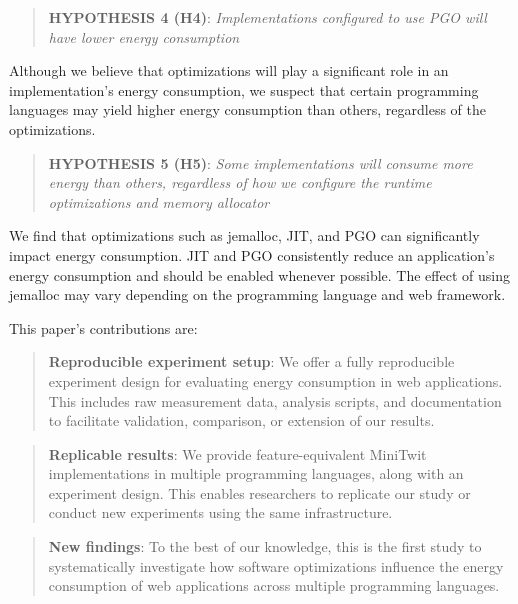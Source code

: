 \documentclass[../main.tex]{subfiles}
\begin{document}
\begin{quote}
    \textbf{HYPOTHESIS 4 (H4)}: \emph{Implementations configured to use PGO will have lower energy consumption}
\end{quote}

Although we believe that optimizations will play a significant role in an implementation's energy consumption, we suspect that certain programming languages may yield higher energy consumption than others, regardless of the optimizations. 

\begin{quote}
    \textbf{HYPOTHESIS 5 (H5)}: \emph{Some implementations will consume more energy than others, regardless of how we configure the runtime optimizations and memory allocator}
\end{quote}

We find that optimizations such as jemalloc, JIT, and PGO can significantly impact energy consumption. JIT and PGO consistently reduce an application's energy consumption and should be enabled whenever possible. The effect of using jemalloc may vary depending on the programming language and web framework.

This paper's contributions are:

\begin{quote}
    \textbf{Reproducible experiment setup}: We offer a fully reproducible experiment design for evaluating energy consumption in web applications. This includes raw measurement data, analysis scripts, and documentation to facilitate validation, comparison, or extension of our results.
\end{quote}

\begin{quote}
    \textbf{Replicable results}: We provide feature-equivalent MiniTwit implementations in multiple programming languages, along with an experiment design. This enables researchers to replicate our study or conduct new experiments using the same infrastructure.
\end{quote}

\begin{quote}
    \textbf{New findings}: To the best of our knowledge, this is the first study to systematically investigate how software optimizations influence the energy consumption of web applications across multiple programming languages.
\end{quote}
\end{document}

